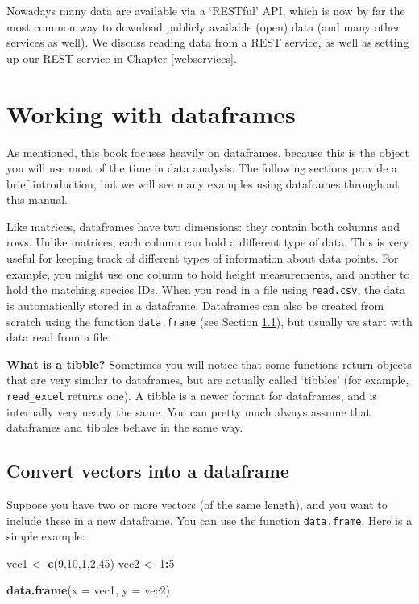 \documentclass[]{book}
\newenvironment{Shaded}{\begin{snugshade}}{\end{snugshade}}
\newcommand{\DataTypeTok}[1]{\textcolor[rgb]{0.13,0.29,0.53}{#1}}
\newcommand{\DecValTok}[1]{\textcolor[rgb]{0.00,0.00,0.81}{#1}}
\newcommand{\KeywordTok}[1]{\textcolor[rgb]{0.13,0.29,0.53}{\textbf{#1}}}
\newcommand{\NormalTok}[1]{#1}
\newcommand{\OperatorTok}[1]{\textcolor[rgb]{0.81,0.36,0.00}{\textbf{#1}}}
\newcommand{\StringTok}[1]{\textcolor[rgb]{0.31,0.60,0.02}{#1}}
\let\BeginKnitrBlock\begin \let\EndKnitrBlock\end
\begin{document}
Nowadays many data are available via a `RESTful' API, which is now by far the most common way to download publicly available (open) data (and many other services as well). We discuss reading data from a REST service, as well as setting up our REST service in Chapter \ref{webservices}.

\hypertarget{dataframes}{%
\section{Working with dataframes}\label{dataframes}}

As mentioned, this book focuses heavily on dataframes, because this is the object you will use most of the time in data analysis. The following sections provide a brief introduction, but we will see many examples using dataframes throughout this manual.

Like matrices, dataframes have two dimensions: they contain both columns and rows. Unlike matrices, each column can hold a different type of data. This is very useful for keeping track of different types of information about data points. For example, you might use one column to hold height measurements, and another to hold the matching species IDs. When you read in a file using \texttt{read.csv}, the data is automatically stored in a dataframe. Dataframes can also be created from scratch using the function \texttt{data.frame} (see Section \ref{vecstodfr}), but usually we start with data read from a file.

\BeginKnitrBlock{rmdinfo}
\textbf{What is a tibble?}
Sometimes you will notice that some functions return objects that are very similar to
dataframes, but are actually called `tibbles' (for example, \texttt{read\_excel} returns one). A tibble is a newer format for dataframes, and is internally very nearly the same. You can pretty much always assume that dataframes and tibbles behave in the same way.
\EndKnitrBlock{rmdinfo}

\hypertarget{vecstodfr}{%
\subsection{Convert vectors into a dataframe}\label{vecstodfr}}

Suppose you have two or more vectors (of the same length), and you want to include these in a new dataframe. You can use the function \texttt{data.frame}. Here is a simple example:

\begin{Shaded}
\begin{Highlighting}[]
\NormalTok{vec1 <-}\StringTok{ }\KeywordTok{c}\NormalTok{(}\DecValTok{9}\NormalTok{,}\DecValTok{10}\NormalTok{,}\DecValTok{1}\NormalTok{,}\DecValTok{2}\NormalTok{,}\DecValTok{45}\NormalTok{)}
\NormalTok{vec2 <-}\StringTok{ }\DecValTok{1}\OperatorTok{:}\DecValTok{5}

\KeywordTok{data.frame}\NormalTok{(}\DataTypeTok{x =}\NormalTok{ vec1, }\DataTypeTok{y =}\NormalTok{ vec2)}
\end{Highlighting}
\end{Shaded}
\end{document}
